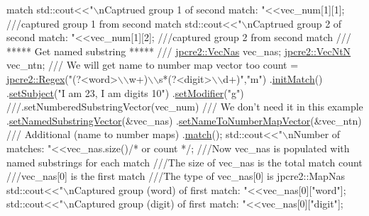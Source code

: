 \begin{DoxyCode}
{       match}
\textcolor{comment}{}std::cout<<\textcolor{stringliteral}{"\(\backslash\)nCaptrued group 1 of second match: "}<<vec\_num[1][1]; \textcolor{comment}{///captured group 1 from second match }
\textcolor{comment}{}std::cout<<\textcolor{stringliteral}{"\(\backslash\)nCaptrued group 2 of second match: "}<<vec\_num[1][2]; \textcolor{comment}{///captured group 2 from second match}
\textcolor{comment}{}
\textcolor{comment}{}
\textcolor{comment}{/// ***** Get named substring ***** ///}
\textcolor{comment}{}
\hyperlink{namespacejpcre2_a2b121ae776ea5b2913839f418a7d856b}{jpcre2::VecNas} vec\_nas;
\hyperlink{namespacejpcre2_a88a7aaf84cad627d34c8152e726168eb}{jpcre2::VecNtN} vec\_ntn; \textcolor{comment}{/// We will get name to number map vector too}
\textcolor{comment}{}count = 
\hyperlink{classjpcre2_1_1Regex}{jpcre2::Regex}(\textcolor{stringliteral}{"(?<word>\(\backslash\)\(\backslash\)w+)\(\backslash\)\(\backslash\)s*(?<digit>\(\backslash\)\(\backslash\)d+)"},\textcolor{stringliteral}{"m"})
        .\hyperlink{classjpcre2_1_1Regex_a519b0915bf1163c6ce6a4d674b30cfcd}{initMatch}()
        .\hyperlink{classjpcre2_1_1RegexMatch_a635c652195deaa8ebb9e107c4f972aab}{setSubject}(\textcolor{stringliteral}{"I am 23, I am digits 10"})
        .\hyperlink{classjpcre2_1_1RegexMatch_a9df7e92f96b61553f62720cb8f5f23e5}{setModifier}(\textcolor{stringliteral}{"g"})\textcolor{comment}{}
\textcolor{comment}{        ///.setNumberedSubstringVector(vec\_num) /// We don't need it in this example}
\textcolor{comment}{}        .\hyperlink{classjpcre2_1_1RegexMatch_ae495431f57cae54363331237ab21b56c}{setNamedSubstringVector}(&vec\_nas)
        .\hyperlink{classjpcre2_1_1RegexMatch_a04926e61d8b5f1d8bdf344efecd567d8}{setNameToNumberMapVector}(&vec\_ntn) \textcolor{comment}{/// Additional (name to number maps)}
\textcolor{comment}{}        .\hyperlink{classjpcre2_1_1RegexMatch_a5868aef3a146594ea1ebef34d122bb33}{match}();
std::cout<<\textcolor{stringliteral}{"\(\backslash\)nNumber of matches: "}<<vec\_nas.size()\textcolor{comment}{/* or count */};\textcolor{comment}{}
\textcolor{comment}{///Now vec\_nas is populated with named substrings for each match}
\textcolor{comment}{///The size of vec\_nas is the total match count}
\textcolor{comment}{///vec\_nas[0] is the first match}
\textcolor{comment}{///The type of vec\_nas[0] is jpcre2::MapNas}
\textcolor{comment}{}std::cout<<\textcolor{stringliteral}{"\(\backslash\)nCaptured group (word) of first match: "}<<vec\_nas[0][\textcolor{stringliteral}{"word"}];
std::cout<<\textcolor{stringliteral}{"\(\backslash\)nCaptured group (digit) of first match: "}<<vec\_nas[0][\textcolor{stringliteral}{"digit"}];

\end{DoxyCode}
